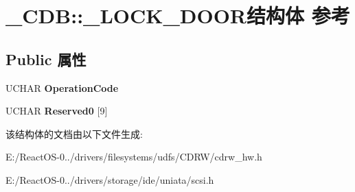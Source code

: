 \hypertarget{struct___c_d_b_1_1___l_o_c_k___d_o_o_r}{}\section{\+\_\+\+C\+DB\+:\+:\+\_\+\+L\+O\+C\+K\+\_\+\+D\+O\+O\+R结构体 参考}
\label{struct___c_d_b_1_1___l_o_c_k___d_o_o_r}
\subsection*{Public 属性}
\begin{DoxyCompactItemize}
\item 
\mbox{\label{struct___c_d_b_1_1___l_o_c_k___d_o_o_r_af6342bc44682f7388fb75ec964c2f03f}} 
U\+C\+H\+AR {\bfseries Operation\+Code}
\item 
\mbox{\label{struct___c_d_b_1_1___l_o_c_k___d_o_o_r_a679fb88d5a566f6e9016f940d97e87f8}} 
U\+C\+H\+AR {\bfseries Reserved0} \mbox{[}9\mbox{]}
\end{DoxyCompactItemize}


该结构体的文档由以下文件生成\+:\begin{DoxyCompactItemize}
\item 
E\+:/\+React\+O\+S-\/0../drivers/filesystems/udfs/\+C\+D\+R\+W/cdrw\+\_\+hw.\+h\item 
E\+:/\+React\+O\+S-\/0../drivers/storage/ide/uniata/scsi.\+h\end{DoxyCompactItemize}
